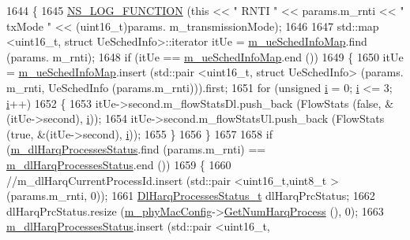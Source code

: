 \begin{DoxyCode}
1644 \{
1645   \hyperlink{log-macros-disabled_8h_a90b90d5bad1f39cb1b64923ea94c0761}{NS\_LOG\_FUNCTION} (\textcolor{keyword}{this} << \textcolor{stringliteral}{" RNTI "} << params.m\_rnti << \textcolor{stringliteral}{" txMode "} << (uint16\_t)params.
      m\_transmissionMode);
1646 
1647   std::map <uint16\_t, struct UeSchedInfo>::iterator itUe = \hyperlink{classns3_1_1MmWaveFlexTtiMaxWeightMacScheduler_a6c90cb4d10b9d6347f7447508f5bebfe}{m\_ueSchedInfoMap}.find (params.
      m\_rnti);
1648   \textcolor{keywordflow}{if} (itUe == \hyperlink{classns3_1_1MmWaveFlexTtiMaxWeightMacScheduler_a6c90cb4d10b9d6347f7447508f5bebfe}{m\_ueSchedInfoMap}.end ())
1649   \{
1650         itUe = \hyperlink{classns3_1_1MmWaveFlexTtiMaxWeightMacScheduler_a6c90cb4d10b9d6347f7447508f5bebfe}{m\_ueSchedInfoMap}.insert (std::pair <uint16\_t, struct UeSchedInfo> (params.
      m\_rnti, UeSchedInfo (params.m\_rnti))).first;
1651         \textcolor{keywordflow}{for} (\textcolor{keywordtype}{unsigned} \hyperlink{bernuolliDistribution_8m_a6f6ccfcf58b31cb6412107d9d5281426}{i} = 0; \hyperlink{bernuolliDistribution_8m_a6f6ccfcf58b31cb6412107d9d5281426}{i} <= 3; \hyperlink{bernuolliDistribution_8m_a6f6ccfcf58b31cb6412107d9d5281426}{i}++)
1652         \{
1653                 itUe->second.m\_flowStatsDl.push\_back (FlowStats (\textcolor{keyword}{false}, &(itUe->second), 
      \hyperlink{bernuolliDistribution_8m_a6f6ccfcf58b31cb6412107d9d5281426}{i}));
1654                 itUe->second.m\_flowStatsUl.push\_back (FlowStats (\textcolor{keyword}{true}, &(itUe->second), 
      \hyperlink{bernuolliDistribution_8m_a6f6ccfcf58b31cb6412107d9d5281426}{i}));
1655         \}
1656   \}
1657 
1658   \textcolor{keywordflow}{if} (\hyperlink{classns3_1_1MmWaveFlexTtiMaxWeightMacScheduler_a798ed476b56504b548455147167df24b}{m\_dlHarqProcessesStatus}.find (params.m\_rnti) == 
      \hyperlink{classns3_1_1MmWaveFlexTtiMaxWeightMacScheduler_a798ed476b56504b548455147167df24b}{m\_dlHarqProcessesStatus}.end ())
1659   \{
1660         \textcolor{comment}{//m\_dlHarqCurrentProcessId.insert (std::pair <uint16\_t,uint8\_t > (params.m\_rnti, 0));}
1661         \hyperlink{classns3_1_1MmWaveFlexTtiMaxWeightMacScheduler_af2731adf8f78ed39f5decc7169a69929}{DlHarqProcessesStatus\_t} dlHarqPrcStatus;
1662         dlHarqPrcStatus.resize (\hyperlink{classns3_1_1MmWaveMacScheduler_a24d7af4971d2e500fe543cefbafa2fd9}{m\_phyMacConfig}->\hyperlink{classns3_1_1MmWavePhyMacCommon_a40773d84172ebeb5aff125f56ebcc5ac}{GetNumHarqProcess} (), 0);
1663         \hyperlink{classns3_1_1MmWaveFlexTtiMaxWeightMacScheduler_a798ed476b56504b548455147167df24b}{m\_dlHarqProcessesStatus}.insert (std::pair <uint16\_t,

\end{DoxyCode}
